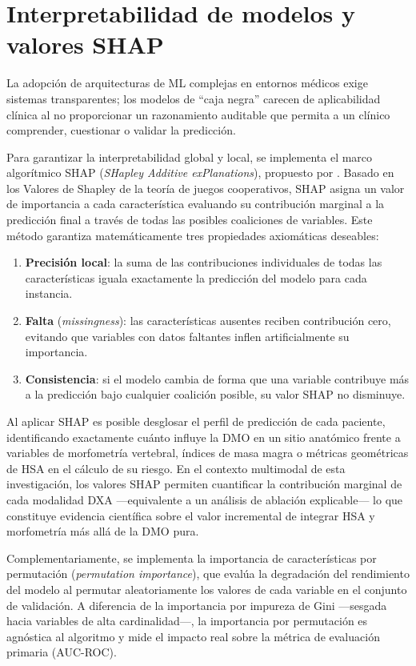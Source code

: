 \documentclass[../tesis.tex]{subfiles}
\begin{document}
\section{Interpretabilidad de modelos y valores SHAP}
\label{sec:shap}

La adopción de arquitecturas de ML complejas en entornos médicos exige sistemas transparentes;
los modelos de ``caja negra'' carecen de aplicabilidad clínica al no proporcionar un razonamiento
auditable que permita a un clínico comprender, cuestionar o validar la predicción.

Para garantizar la interpretabilidad global y local, se implementa el marco algorítmico SHAP
(\textit{SHapley Additive exPlanations}), propuesto por \textcite{Lundberg2017}.
Basado en los Valores de Shapley de la teoría de juegos cooperativos, SHAP asigna un valor de
importancia a cada característica evaluando su contribución marginal a la predicción final a
través de todas las posibles coaliciones de variables.
Este método garantiza matemáticamente tres propiedades axiomáticas deseables:

\begin{enumerate}
  \item \textbf{Precisión local}: la suma de las contribuciones individuales de todas las
    características iguala exactamente la predicción del modelo para cada instancia.
  \item \textbf{Falta} (\textit{missingness}): las características ausentes reciben contribución
    cero, evitando que variables con datos faltantes inflen artificialmente su importancia.
  \item \textbf{Consistencia}: si el modelo cambia de forma que una variable contribuye más a
    la predicción bajo cualquier coalición posible, su valor SHAP no disminuye.
\end{enumerate}

Al aplicar SHAP es posible desglosar el perfil de predicción de cada paciente, identificando
exactamente cuánto influye la DMO en un sitio anatómico frente a variables de morfometría
vertebral, índices de masa magra o métricas geométricas de HSA en el cálculo de su riesgo.
En el contexto multimodal de esta investigación, los valores SHAP permiten cuantificar la
contribución marginal de cada modalidad DXA ---equivalente a un análisis de ablación explicable---
lo que constituye evidencia científica sobre el valor incremental de integrar HSA y morfometría
más allá de la DMO pura.

Complementariamente, se implementa la importancia de características por permutación
(\textit{permutation importance}), que evalúa la degradación del rendimiento del modelo al
permutar aleatoriamente los valores de cada variable en el conjunto de validación.
A diferencia de la importancia por impureza de Gini ---sesgada hacia variables de alta
cardinalidad---, la importancia por permutación es agnóstica al algoritmo y mide el impacto
real sobre la métrica de evaluación primaria (AUC-ROC).
\end{document}
